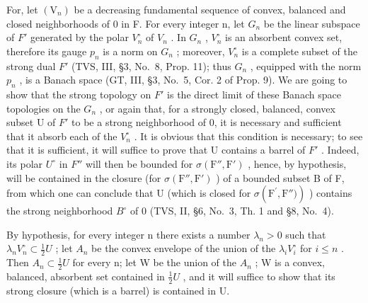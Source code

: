 For, let \((\mathrm{V}_{n})\) be a decreasing fundamental sequence of convex, balanced and closed neighborhoods of 0 in F. For every integer n, let \(G_{n}\) be the linear subspace of \(F'\) generated by the polar \(V_{n}^{\circ}\) of \(V_{n}\) . In \(G_{n}\) , \(V_{n}^{\circ}\) is an absorbent convex set, therefore its gauge \(p_{n}\) is a norm on \(G_{n}\) ; moreover, \(V_{n}^{\circ}\) is a complete subset of the strong dual \(F'\) (TVS, III, §3, No.~8, Prop. 11); thus \(G_{n}\) , equipped with the norm \(p_{n}\) , is a Banach space (GT, III, §3, No.~5, Cor. 2 of Prop. 9). We are going to show that the strong topology on \(F'\) is the direct limit of these Banach space topologies on the \(G_{n}\) , or again that, for a strongly closed, balanced, convex subset U of \(F'\) to be a strong neighborhood of 0, it is necessary and sufficient that it absorb each of the \(V_{n}^{\circ}\) . It is obvious that this condition is necessary; to see that it is sufficient, it will suffice to prove that U contains a barrel of \(F'\) . Indeed, its polar \(U^{\circ}\) in \(F''\) will then be bounded for \(\sigma(\mathrm{F}''\mathrm{,}\mathrm{F}')\) , hence, by hypothesis, will be contained in the closure (for \(\sigma(\mathrm{F}''\mathrm{,}\mathrm{F}')\) ) of a bounded subset B of F, from which one can conclude that U (which is closed for \(\sigma(\mathrm{F}^{\prime},\mathrm{F}''\mathrm{)})\) ) contains the strong neighborhood \(B^{\circ}\) of 0 (TVS, II, §6, No.~3, Th. 1 and §8, No.~4).

By hypothesis, for every integer n there exists a number \(\lambda_{n}>0\) such that \(\lambda_{n}V_{n}^{\circ}\subset\frac{1}{2}U\) ; let \(A_{n}\) be the convex envelope of the union of the \(\lambda_{i}V_{i}^{\circ}\) for \(i\leqslant n\) . Then \(A_{n}\subset\frac{1}{2}U\) for every n; let W be the union of the \(A_{n}\) ; W is a convex, balanced, absorbent set contained in \(\frac{1}{2}U\) , and it will suffice to show that its strong closure (which is a barrel) is contained in U.

